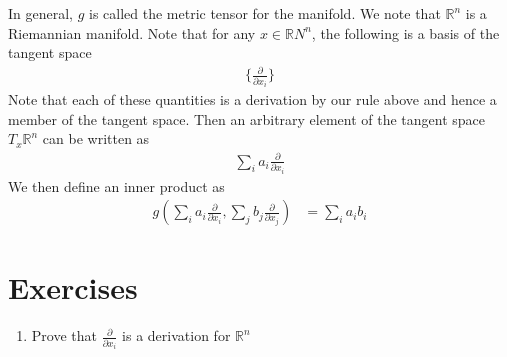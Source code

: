 \documentclass[book.tex]{subfiles}
\begin{document}
In general, $g$ is called the metric tensor for the manifold. We note that $\mathbb{R}^n$ is a Riemannian manifold. Note that for any $x \in \mathbb{R}N^n$, the following is a basis of the tangent space
\begin{align}
    \{\frac{\partial}{\partial x_i} \}
\end{align}
Note that each of these quantities is a derivation by our rule above and hence a member of the tangent space. Then an arbitrary element of the tangent space $T_x \mathbb{R}^n$ can be written as
\begin{align}
    \sum_i a_i \frac{\partial}{\partial x_i}
\end{align}
We then define an inner product as
\begin{align}
    g\left ( \sum_i a_i \frac{\partial}{\partial x_i}, \sum_j b_j \frac{\partial}{\partial x_j} \right ) &= \sum_i a_i b_i
\end{align}

\section{Exercises}
\begin{enumerate}
    \item Prove that $\frac{\partial}{\partial x_i}$ is a derivation for $\mathbb{R}^n$
\end{enumerate}
\end{document}
